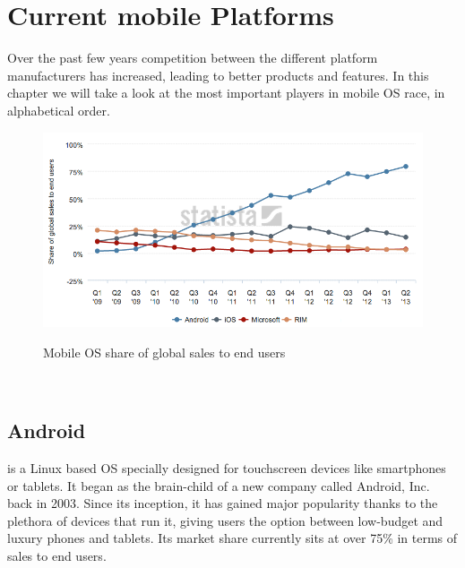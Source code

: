 \chapter{Current mobile Platforms}\label{ch:m_plats}
Over the past few years competition between the different platform manufacturers has increased, leading to better products and features. In this chapter we will take a look at the most important players in mobile \ac{OS} race, in alphabetical order.

\begin{figure}[H]
    \begin{center}
        {\includegraphics[width=1\linewidth]{gfx/statista-mobile}}
        \caption[Mobile OS share of global sales to end users]{Mobile OS share of global sales to end users\footnotemark}\label{fig:trend}
    \end{center}
\end{figure}
\\

\section{Android}
 is a Linux based \ac{OS} specially designed for touchscreen devices like smartphones or tablets. It began as the brain-child of a new company called Android, Inc. back in 2003. Since its inception, it has gained major popularity thanks to the plethora of devices that run it, giving users the option between low-budget and luxury phones and tablets. Its market share currently sits at over 75\% in terms of sales to end users.

